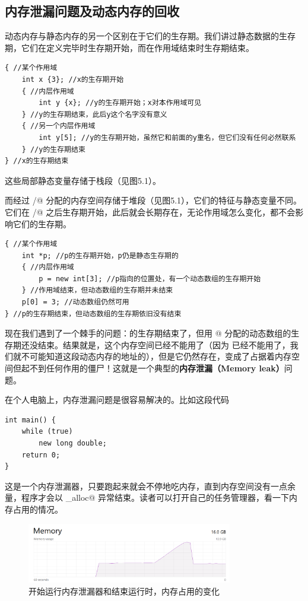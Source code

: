 \subsection*{内存泄漏问题及动态内存的回收}
动态内存与静态内存的另一个区别在于它们的生存期。我们讲过静态数据的生存期，它们在定义完毕时生存期开始，而在作用域结束时生存期结束。
\begin{lstlisting}
{ //某个作用域
    int x {3}; //x的生存期开始
    { //内层作用域
        int y {x}; //y的生存期开始；x对本作用域可见
    } //y的生存期结束，此后y这个名字没有意义
    { //另一个内层作用域
        int y[5]; //y的生存期开始，虽然它和前面的y重名，但它们没有任何必然联系
    } //y的生存期结束
} //x的生存期结束
\end{lstlisting}
这些局部静态变量存储于栈段（见图5.1）。\par
而经过 \lstinline@new@/\lstinline@new[]@ 分配的内存空间存储于堆段（见图5.1），它们的特征与静态变量不同。它们在 \lstinline@new@/\lstinline@new[]@ 之后生存期开始，此后就会长期存在，无论作用域怎么变化，都不会影响它们的生存期。
\begin{lstlisting}
{ //某个作用域
    int *p; //p的生存期开始，p仍是静态生存期的
    { //内层作用域
        p = new int[3]; //p指向的位置处，有一个动态数组的生存期开始
    } //作用域结束，但动态数组的生存期并未结束
    p[0] = 3; //动态数组仍然可用
} //p的生存期结束，但动态数组的生存期依旧没有结束
\end{lstlisting}
现在我们遇到了一个棘手的问题：\lstinline@p@ 的生存期结束了，但用 \lstinline@new[]@ 分配的动态数组的生存期还没结束。结果就是，这个内存空间已经不能用了（因为 \lstinline@p@ 已经不能用了，我们就不可能知道这段动态内存的地址的），但是它仍然存在，变成了占据着内存空间但起不到任何作用的僵尸！这就是一个典型的\textbf{内存泄漏（Memory leak）}问题。\par
在个人电脑上，内存泄漏问题是很容易解决的。比如这段代码
\begin{lstlisting}
int main() {
    while (true)
        new long double;
    return 0;
}
\end{lstlisting}
这是一个内存泄漏器，只要跑起来就会不停地吃内存，直到内存空间没有一点余量，程序才会以 \lstinline@bad_alloc@ 异常结束。读者可以打开自己的任务管理器，看一下内存占用的情况。\par
\begin{figure}[htbp]
    \centering
    \includegraphics[width=0.8\textwidth]{../images/generalized_parts/05_memory_leak_and_after_end_task.png}
    \caption{开始运行内存泄漏器和结束运行时，内存占用的变化}
\end{figure}
